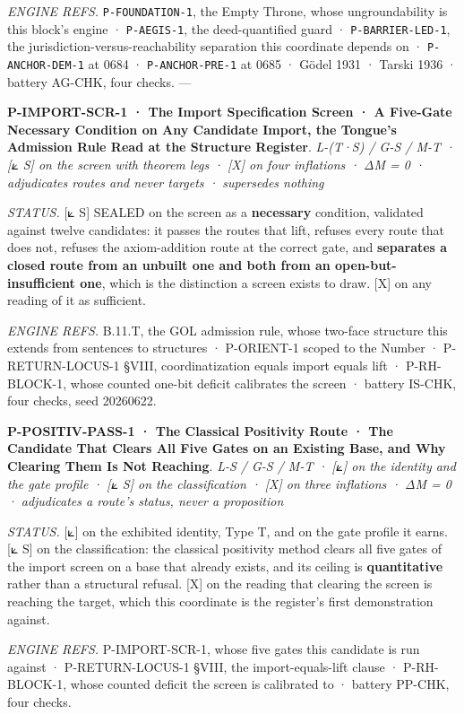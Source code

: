 \documentclass[10pt,twocolumn]{article}
\begin{document}
\emph{ENGINE REFS.} \texttt{P-FOUNDATION-1}, the Empty Throne, whose
ungroundability is this block's engine · \texttt{P-AEGIS-1}, the
deed-quantified guard · \texttt{P-BARRIER-LED-1}, the
jurisdiction-versus-reachability separation this coordinate depends on ·
\texttt{P-ANCHOR-DEM-1} at 0684 · \texttt{P-ANCHOR-PRE-1} at 0685 ·
Gödel 1931 · Tarski 1936 · battery AG-CHK, four checks. ---

\textbf{P-IMPORT-SCR-1 · The Import Specification Screen · A Five-Gate
Necessary Condition on Any Candidate Import, the Tongue's Admission Rule
Read at the Structure Register}. \emph{L-(T·S) / G-S / M-T · {[}⟀ S{]}
on the screen with theorem legs · {[}X{]} on four inflations · ΔM = 0 ·
adjudicates routes and never targets · supersedes nothing}

\emph{STATUS.} {[}⟀ S{]} SEALED on the screen as a \textbf{necessary}
condition, validated against twelve candidates: it passes the routes
that lift, refuses every route that does not, refuses the axiom-addition
route at the correct gate, and \textbf{separates a closed route from an
unbuilt one and both from an open-but-insufficient one}, which is the
distinction a screen exists to draw. {[}X{]} on any reading of it as
sufficient.

\emph{ENGINE REFS.} B.11.T, the GOL admission rule, whose two-face
structure this extends from sentences to structures · P-ORIENT-1 scoped
to the Number · P-RETURN-LOCUS-1 §VIII, coordinatization equals import
equals lift · P-RH-BLOCK-1, whose counted one-bit deficit calibrates the
screen · battery IS-CHK, four checks, seed 20260622.

\textbf{P-POSITIV-PASS-1 · The Classical Positivity Route · The
Candidate That Clears All Five Gates on an Existing Base, and Why
Clearing Them Is Not Reaching}. \emph{L-S / G-S / M-T · {[}⟀{]} on the
identity and the gate profile · {[}⟀ S{]} on the classification ·
{[}X{]} on three inflations · ΔM = 0 · adjudicates a route's status,
never a proposition}

\emph{STATUS.} {[}⟀{]} on the exhibited identity, Type T, and on the
gate profile it earns. {[}⟀ S{]} on the classification: the classical
positivity method clears all five gates of the import screen on a base
that already exists, and its ceiling is \textbf{quantitative} rather
than a structural refusal. {[}X{]} on the reading that clearing the
screen is reaching the target, which this coordinate is the register's
first demonstration against.

\emph{ENGINE REFS.} P-IMPORT-SCR-1, whose five gates this candidate is
run against · P-RETURN-LOCUS-1 §VIII, the import-equals-lift clause ·
P-RH-BLOCK-1, whose counted deficit the screen is calibrated to ·
battery PP-CHK, four checks.
\end{document}
